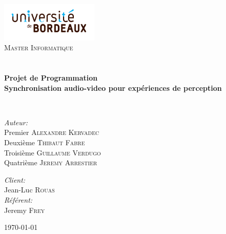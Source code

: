\begin{titlepage}
\begin{center}

\includegraphics[width=0.35\textwidth]{./logo}~\\[1cm]

\textsc{\LARGE Master Informatique}\\[1.5cm]

\textsc{\Large }\\[0.5cm]

\HRule \\[0.4cm]

{\huge \bfseries Projet de Programmation\\
Synchronisation audio-video pour expériences de perception \\[0.4cm] }

\HRule \\[1.5cm]

\begin{minipage}{0.4\textwidth}
\begin{flushleft} \large
\emph{Auteur:}\\
Premier \textsc{Alexandre Kervadec}\\
Deuxième \textsc{Thibaut Fabre}\\
Troisième \textsc{Guillaume Verdugo}\\
Quatrième \textsc{Jeremy Arrestier}
\end{flushleft}
\end{minipage}
\begin{minipage}{0.4\textwidth}
\begin{flushright} \large
\emph{Client:} \\
Jean-Luc \textsc{Rouas}\\
\emph{Référent:} \\
Jeremy \textsc{Frey}
\end{flushright}
\end{minipage}

\vfill

{\large \today}

\end{center}
\end{titlepage}